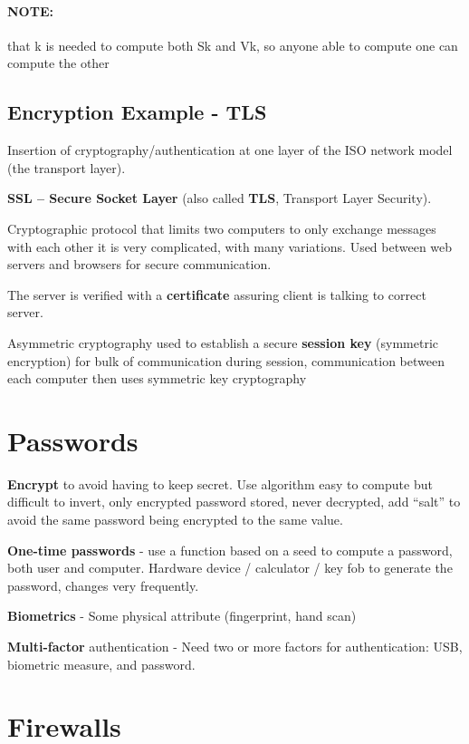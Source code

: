 \paragraph{NOTE:} that k is needed to compute both Sk and Vk, so anyone able to
compute one can compute the other


\subsection{Encryption Example - TLS}
Insertion of cryptography/authentication at one layer of the ISO
network model (the transport layer).

\textbf{SSL – Secure Socket Layer} (also called \textbf{TLS}, Transport Layer Security).

Cryptographic protocol that limits two computers to only exchange messages with each other it is very complicated, with many variations. Used between web servers and browsers for secure communication.

The server is verified with a \textbf{certificate} assuring client is talking to
correct server.

Asymmetric cryptography used to establish a secure \textbf{session key} (symmetric encryption) for bulk of communication during session, communication between each computer then uses symmetric key cryptography

\newpage
\section{Passwords}
\textbf{Encrypt} to avoid having to keep secret. Use algorithm easy to compute but difficult to invert, only encrypted password stored, never decrypted, add “salt” to avoid the same password being encrypted to the same value.

\textbf{One-time passwords} - use a function based on a seed to compute a password, both user and
computer. Hardware device / calculator / key fob to generate the password, changes very frequently.


\textbf{Biometrics} - Some physical attribute (fingerprint, hand scan)


\textbf{Multi-factor} authentication - Need two or more factors for authentication:  USB, biometric measure, and password.

\section{Firewalls}

